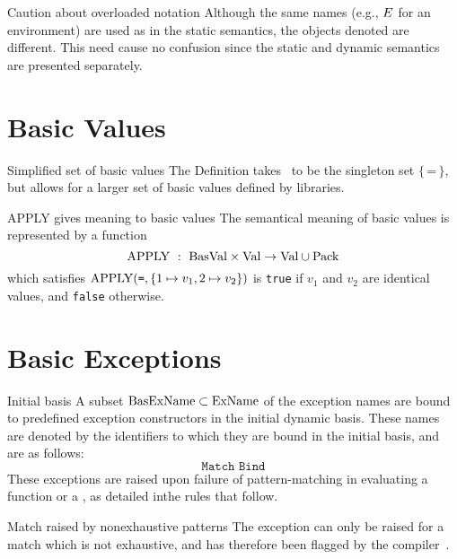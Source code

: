 \begin{remark}{Caution about overloaded notation}
Although the same names (e.g., $E$ for an environment) are used
as in the static semantics, the objects denoted are different.
This need cause no confusion since the static and dynamic semantics are
presented separately. 
\end{remark}

\section{Basic Values}

\begin{clause}{Simplified set of basic values}
The Definition takes \BasVal\ to be the singleton set
$\{\,\texttt{=}\,\}$, but allows for a larger set of basic values
defined by libraries.
\end{clause}

\begin{clause}{APPLY gives meaning to basic values}
The semantical meaning of basic values is represented by a function
\begin{equation*}
\APPLY\ :\ \BasVal\times\Val\to\Val\cup\Pack
\end{equation*}
which satisfies ${\rm APPLY}(\texttt{=},\{1\mapsto v_{1},2\mapsto v_{2}\})$
is \texttt{true} if $v_{1}$ and $v_{2}$ are identical values, and
\texttt{false} otherwise.
\end{clause}

\section{Basic Exceptions}

\begin{clause}{Initial basis}
A subset ${\rm BasExName}\subset{\rm ExName}$ of the exception names are bound to
predefined exception constructors in the initial dynamic basis. These
names are denoted by the identifiers to which they are bound in the
initial basis, and are as follows:
\begin{equation*}
\texttt{Match\ \ Bind}
\end{equation*}
These exceptions are raised upon failure of pattern-matching in
evaluating a function or a \valbind, as detailed inthe rules that follow.
\end{clause}

\begin{clause}{Match raised by nonexhaustive patterns}
The exception  can only be raised for a match which is not
exhaustive, and has therefore been flagged by the compiler~.
\end{clause}

